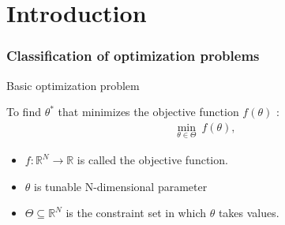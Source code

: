 %
%


\section{Introduction }
\begin{frame}
\frametitle{\centering Classification of optimization problems}
\begin{block}{Basic optimization problem}
\begin{small}
To find $\theta^{*}$ that minimizes the objective function $f(\theta)$ :
\begin{align}\label{eq:opt}
 \underset{\theta \in \Theta}{\min} ~f(\theta),
\end{align}
\end{small}
\end{block}
\begin{small}
\begin{itemize}
\item $f \colon \mathbb{R}^N \to \mathbb{R}$ is called the objective function.
\item $\theta$ is tunable N-dimensional parameter
\item $\Theta \subseteq \mathbb{R}^N$ is the constraint set in which $\theta$ takes values.
\end{itemize}
\end{small}
\end{frame}

